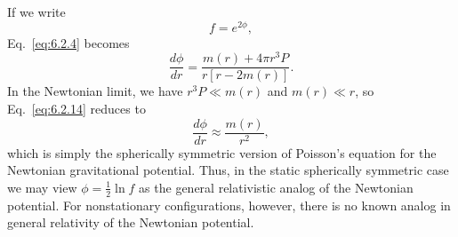 If we write
\begin{equation}
  f=e^{2\phi},
  \tag{6.2.13}\label{eq:6.2.13}
\end{equation}
Eq.~\eqref{eq:6.2.4} becomes
\begin{equation}
  \frac{d\phi}{dr}=\frac{m(r)+4\pi r^3P}{r[r-2m(r)]}.
  \tag{6.2.14}\label{eq:6.2.14}
\end{equation}
In the Newtonian limit, we have \(r^3P\ll m(r)\) and \(m(r)\ll r\), so
Eq.~\eqref{eq:6.2.14} reduces to
\begin{equation}
  \frac{d\phi}{dr}\approx\frac{m(r)}{r^2},
  \tag{6.2.15}\label{eq:6.2.15}
\end{equation}
which is simply the spherically symmetric version of Poisson's equation for the
Newtonian gravitational potential. Thus, in the static spherically symmetric case
we may view \(\phi=\tfrac12\ln f\) as the general relativistic analog of the
Newtonian potential. For nonstationary configurations, however, there is no known
analog in general relativity of the Newtonian potential.


